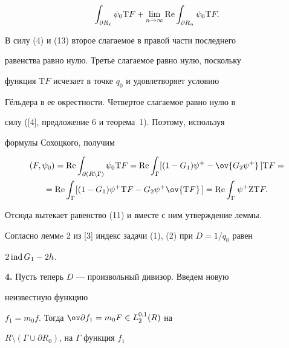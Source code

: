 \begin{pf}
\begin{multline*}
\int_{\partial R_\varepsilon}\psi_0{\mathrm T}F+ 


\lim_{n\to\infty}\re\int_{\partial R_n}\psi_0{\mathrm T}F. 


\end{multline*} 


В силу (4) и (13) второе слагаемое в правой части последнего 


равенства равно нулю. Третье слагаемое равно нулю, поскольку 


функция ${\mathrm T}F$ исчезает в точке $q_0$ и удовлетворяет условию 


Г\"ельдера в ее окрестности. Четвертое слагаемое равно нулю в 


силу ([4], предложение 6 и теорема~1). Поэтому, используя 


формулы Сохоцкого, получим 


\begin{multline*} 


(F,\psi_0)=\re\int_{\partial(R\setminus\Gamma)} 


\psi_0{\mathrm T}F=\re\int_\Gamma[(1-G_1)\psi^+- 


\ov{G_2\psi^+}\,]{\mathrm T}F= \\ 


% 


=\re\int_\Gamma[(1-G_1)\psi^+{\mathrm T}F-G_2\psi^+ 


\ov{{\mathrm T}F}\,]=\re\int_\Gamma\psi^+{\mathrm Z}{\mathrm T}F. 


\end{multline*} 


Отсюда вытекает равенство (11) и вместе с ним утверждение леммы. 


\end{pf} 


 


Согласно леммe 2 из [3] индекс задачи (1), (2) при $D=1/q_0$ равен 


$2\operatorname{ind} G_1-2h$. 


\medskip 


 


{\bf 4.} Пусть теперь $D$ --- произвольный дивизор. Введем новую 


неизвестную функцию 


$f_1=m_0f$. Тогда $\ov\partial f_1=m_0F\in L^{0,1}_2(R)$ на 


$R\setminus(\Gamma\cup\partial R_0)$, на $\Gamma$ функция $f_1$ 


